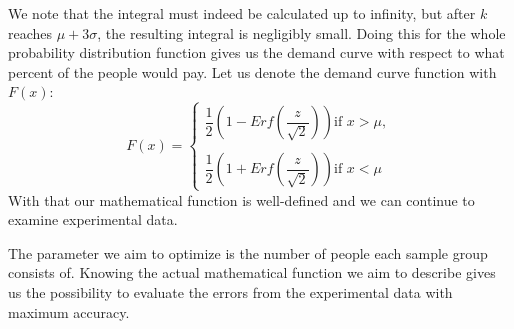 \documentclass[11pt, a4paper]{article}
\begin{document}
		We note that the integral must indeed be calculated up to infinity, but after $k$ reaches $\mu+3\sigma$, the resulting integral is negligibly small. Doing this for the whole probability distribution function gives us the demand curve with respect to what percent of the people would pay. Let us denote the demand curve function with $F(x)$:
		$$
		F(x)=
		\begin{cases}
			\dfrac{1}{2}\left (1-Erf\left (\dfrac{z}{\sqrt{2}}\right )\right ) \text{if } x>\mu,\\
			\\
			\dfrac{1}{2}\left (1+Erf\left (\dfrac{z}{\sqrt{2}}\right )\right ) \text{if } x<\mu
		\end{cases}
		$$
		With that our mathematical function is well-defined and we can continue to examine experimental data.\par
		The parameter we aim to optimize is the number of people each sample group consists of. Knowing the actual mathematical function we aim to describe gives us the possibility to evaluate the errors from the experimental data with maximum accuracy.
\end{document}
